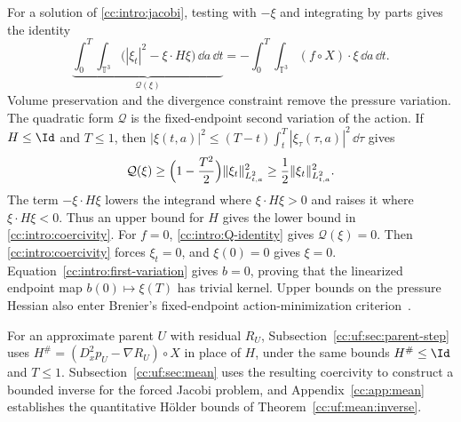 For a solution of \eqref{cc:intro:jacobi}, testing with $-\xi$ and
integrating by parts gives the identity
\begin{equation}\label{cc:intro:Q-identity}
 \underbrace{\int_0^T\!\int_{\mathbb T^3}
   \bigl(|\xi_t|^2-\xi\cdot H\xi\bigr)\,\dd a\,\dd t}_{\mathcal Q(\xi)}
 =-\int_0^T\!\int_{\mathbb T^3}(f\circ X)\cdot\xi\,\dd a\,\dd t.
\end{equation}
Volume preservation and the divergence constraint remove the pressure
variation. The quadratic form $\mathcal Q$ is the fixed-endpoint second variation of the action.
If $H\le\Id$ and $T\le1$, then
${|\xi(t,a)|^2\le(T-t)\int_t^T|\xi_\tau(\tau,a)|^2\,\dd\tau}$ gives
\begin{equation}\label{cc:intro:coercivity}
 \mathcal Q(\xi)\ge\Bigl(1-\frac{T^2}{2}\Bigr)\|\xi_t\|_{L^2_{t,a}}^2
 \ge\frac12\|\xi_t\|_{L^2_{t,a}}^2 .
\end{equation}
The term $-\xi\cdot H\xi$ lowers the integrand where $\xi\cdot H\xi>0$
and raises it where $\xi\cdot H\xi<0$. Thus an upper bound for $H$ gives
the lower bound in \eqref{cc:intro:coercivity}.
For $f=0$, \eqref{cc:intro:Q-identity} gives $\mathcal Q(\xi)=0$. Then
\eqref{cc:intro:coercivity} forces $\xi_t=0$, and $\xi(0)=0$ gives $\xi=0$.
Equation~\eqref{cc:intro:first-variation} gives $b=0$, proving that the linearized
endpoint map $b(0)\mapsto\xi(T)$ has trivial kernel.
Upper bounds on the pressure Hessian also enter Brenier's fixed-endpoint
action-minimization criterion~\cite{Brenier1989,Brenier1999}.

For an approximate parent $U$ with residual $R_U$,
Subsection~\ref{cc:uf:sec:parent-step} uses
$H^\#=(D_x^2p_U-\nabla R_U)\circ X$ in place of $H$, under the same
bounds $H^\#\le\Id$ and $T\le1$. Subsection~\ref{cc:uf:sec:mean} uses
the resulting coercivity to construct a bounded inverse for the forced
Jacobi problem, and
Appendix~\ref{cc:app:mean} establishes the quantitative H\"older bounds
of Theorem~\ref{cc:uf:mean:inverse}.

